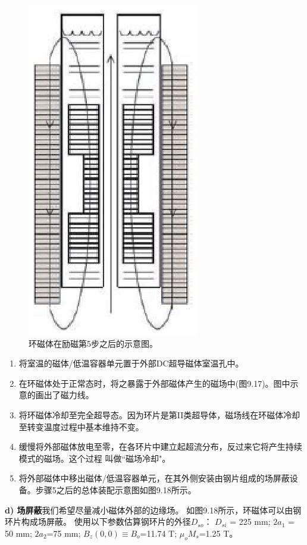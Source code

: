 \begin{figure}
	\centering
	\includegraphics[scale=0.8]{chpt9/figs/fig9.18.eps}
	\caption{环磁体在励磁第5步之后的示意图。}
\end{figure}

\begin{enumerate}
	\item 将室温的磁体/低温容器单元置于外部DC超导磁体室温孔中。
	\item 在环磁体处于正常态时，将之暴露于外部磁体产生的磁场中(图9.17)。图中示意的画出了磁力线。
	\item 将环磁体冷却至完全超导态。因为环片是第II类超导体，磁场线在环磁体冷却至转变温度过程中基本维持不变。
	\item 缓慢将外部磁体放电至零，在各环片中建立起超流分布，反过来它将产生持续模式的磁场。这个过程
	叫做``磁场冷却"。
	\item 将外部磁体中移出磁体/低温容器单元，在其外侧安装由钢片组成的场屏蔽设备。步骤5之后的总体装配示意图如图9.18所示。	
\end{enumerate}

\textbf{d) 场屏蔽}\qquad 我们希望尽量减小磁体外部的边缘场。
如图9.18所示，环磁体可以由钢环片构成场屏蔽。
使用以下参数估算钢环片的外径$D_{so}$：
$D_{si}$ = 225 mm; $2a_1$ = 50 mm;
$2a_2$=75 mm; $B_z(0, 0)\equiv B_o$=11.74 T; $\mu_o M_s$=1.25 T。

